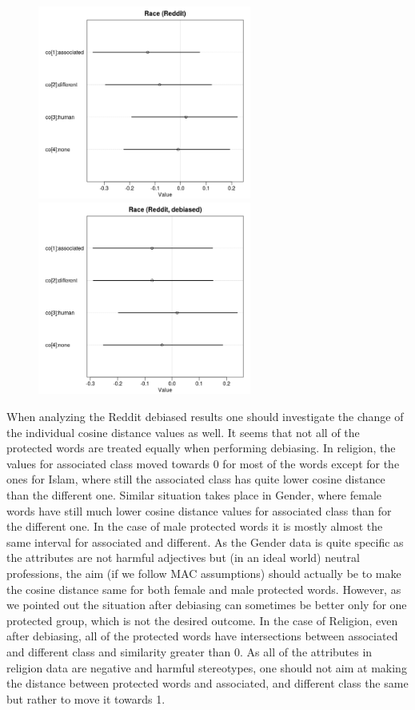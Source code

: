 \documentclass[10pt,dvipsnames,enabledeprecatedfontcommands]{scrartcl}
\begin{document}
\begin{center}
\begin{figure}[!htb]
   
  \begin{minipage}{0.55\textwidth}
\includegraphics[width=7cm]{../images/raceCoeffs.jpeg}
\end{minipage}
   \begin {minipage}{0.43\textwidth}
    \includegraphics[width=7cm]{../images/debiasedRaceRedditCoeffs.jpeg}
   \end{minipage}
\end{figure}

\end{center}

When analyzing the Reddit debiased results one should investigate the
change of the individual cosine distance values as well. It seems that
not all of the protected words are treated equally when performing
debiasing. In religion, the values for associated class moved towards 0
for most of the words except for the ones for Islam, where still the
associated class has quite lower cosine distance than the different one.
Similar situation takes place in Gender, where female words have still
much lower cosine distance values for associated class than for the
different one. In the case of male protected words it is mostly almost
the same interval for associated and different. As the Gender data is
quite specific as the attributes are not harmful adjectives but (in an
ideal world) neutral professions, the aim (if we follow MAC assumptions)
should actually be to make the cosine distance same for both female and
male protected words. However, as we pointed out the situation after
debiasing can sometimes be better only for one protected group, which is
not the desired outcome. In the case of Religion, even after debiasing,
all of the protected words have intersections between associated and
different class and similarity greater than 0. As all of the attributes
in religion data are negative and harmful stereotypes, one should not
aim at making the distance between protected words and associated, and
different class the same but rather to move it towards 1.
\end{document}
